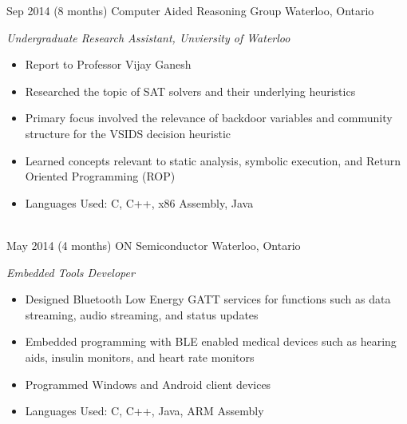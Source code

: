 \documentclass[print]{friggeri-cv} %
\begin{document}
\begin{entrylist}
\entry
{Sep 2014}
{(8 months)}
{Computer Aided Reasoning Group}
{Waterloo, Ontario}
{\emph{Undergraduate Research Assistant, Unviersity of Waterloo}
\begin{itemize}
\item Report to Professor Vijay Ganesh 
\item Researched the topic of SAT solvers and their underlying heuristics
\item Primary focus involved the relevance of backdoor variables and community structure for the VSIDS decision heuristic
\item Learned concepts relevant to static analysis, symbolic execution, and Return Oriented Programming (ROP) 
\item Languages Used: C, C++, x86 Assembly, Java
\end{itemize}
}\\


\entry
{May 2014}
{(4 months)}
{ON Semiconductor}
{Waterloo, Ontario}
{\emph{Embedded Tools Developer}
\begin{itemize}
\item Designed Bluetooth Low Energy GATT services for functions such as data streaming, audio streaming, and status updates
\item Embedded programming with BLE enabled medical devices such as hearing aids, insulin monitors, and heart rate monitors
\item Programmed Windows and Android client devices
\item Languages Used: C, C++, Java, ARM Assembly
\end{itemize}
}\\


\end{entrylist}

\goodbreak
{}
\renewcommand{\entry}[5]{%
  \parbox[t]{1.4cm}{\footnotesize \textbf{#1} \\ \scriptsize\addfontfeature{Color=lightgray} #2}&\parbox[t]{15.4cm}{%
    \textbf{#3}%
    \hfill%
    {\footnotesize\addfontfeature{Color=lightgray} #4}%
    \justify #5\vspace{\parsep}%
  }\\}
\end{document}
